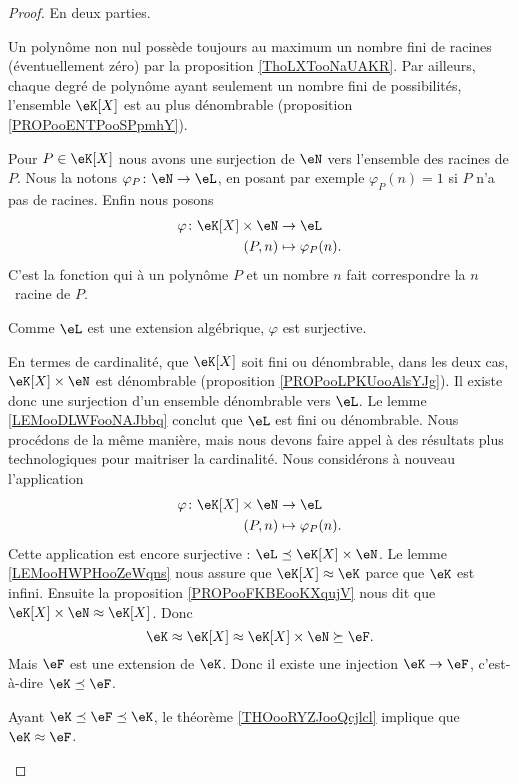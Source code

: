\begin{proof}
	En deux parties.
	\begin{subproof}
		Un polynôme non nul possède toujours au maximum un nombre fini de racines (éventuellement zéro) par la proposition \ref{ThoLXTooNaUAKR}. Par ailleurs, chaque degré de polynôme ayant seulement un nombre fini de possibilités, l'ensemble \( \eK[X]\) est au plus dénombrable (proposition \ref{PROPooENTPooSPpmhY}).

		Pour \( P\in \eK[X]\) nous avons une surjection de \( \eN\) vers l'ensemble des racines de \( P\). Nous la notons \( \varphi_P\colon \eN\to \eL\), en posant par exemple \( \varphi_P(n)=1\) si \( P\) n'a pas de racines. Enfin nous posons
		\begin{equation}
			\begin{aligned}
				\varphi\colon \eK[X]\times \eN & \to \eL               \\
				(P,n)                          & \mapsto \varphi_P(n).
			\end{aligned}
		\end{equation}
		C'est la fonction qui à un polynôme \( P\) et un nombre \( n\) fait correspondre la \( n\)\ieme\ racine de \( P\).

		Comme \( \eL\) est une extension algébrique, \( \varphi\) est surjective.

		En termes de cardinalité, que \( \eK[X]\) soit fini ou dénombrable, dans les deux cas, \( \eK[X]\times \eN\) est dénombrable (proposition \ref{PROPooLPKUooAlsYJg}). Il existe donc une surjection d'un ensemble dénombrable vers \( \eL\). Le lemme \ref{LEMooDLWFooNAJbbq} conclut que \( \eL\) est fini ou dénombrable.
		Nous procédons de la même manière, mais nous devons faire appel à des résultats plus technologiques pour maitriser la cardinalité. Nous considérons à nouveau l'application
		\begin{equation}
			\begin{aligned}
				\varphi\colon \eK[X]\times \eN & \to \eL               \\
				(P,n)                          & \mapsto \varphi_P(n).
			\end{aligned}
		\end{equation}
		Cette application est encore surjective : \( \eL\preceq \eK[X]\times \eN\). Le lemme \ref{LEMooHWPHooZeWqns} nous assure que \( \eK[X]\approx \eK\) parce que \( \eK\) est infini. Ensuite la proposition \ref{PROPooFKBEooKXqujV} nous dit que \( \eK[X]\times \eN\approx \eK[X]\). Donc
		\begin{equation}
			\eK\approx \eK[X]\approx \eK[X]\times \eN\succeq \eF.
		\end{equation}
		Mais \( \eF\) est une extension de \( \eK\). Donc il existe une injection \( \eK\to \eF\), c'est-à-dire \( \eK\preceq \eF\).

		Ayant \( \eK\preceq \eF\preceq \eK\), le théorème \ref{THOooRYZJooQcjlcl} implique que \( \eK\approx \eF\).
	\end{subproof}
\end{proof}

